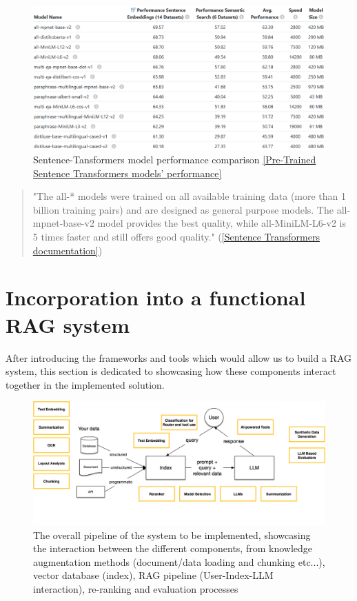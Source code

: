 \begin{figure}[htbp]
    \centering
    \includegraphics[width=\linewidth]{./figures/embedding-modes-performance.png}
    \caption{Sentence-Tansformers model performance comparison \href{https://sbert.net/docs/sentence_transformer/pretrained_models.html}{[Pre-Trained Sentence Transformers models' performance]}}
\end{figure}
\begin{quote}
    "The all-* models were trained on all available training data (more than 1 billion training pairs) and are designed as general purpose models. The all-mpnet-base-v2 model provides the best quality, while all-MiniLM-L6-v2 is 5 times faster and still offers good quality."  (\href{https://sbert.net/docs/sentence_transformer/pretrained_models.html}{[Sentence Transformers documentation]})
\end{quote}
\newpage

\section{Incorporation into a functional RAG system}
After introducing the frameworks and tools which would allow us to build a RAG system, this section is dedicated to showcasing how these components interact together in the implemented solution.
\begin{figure}[htbp]
    \centering
    \includegraphics[width=\linewidth]{./figures/rag_components.png}
    \caption{The overall pipeline of the system to be implemented, showcasing the interaction between the different components, from knowledge augmentation methods (document/data loading and chunking etc...), vector database (index), RAG pipeline (User-Index-LLM interaction), re-ranking and evaluation processes}
\end{figure}\newpage

